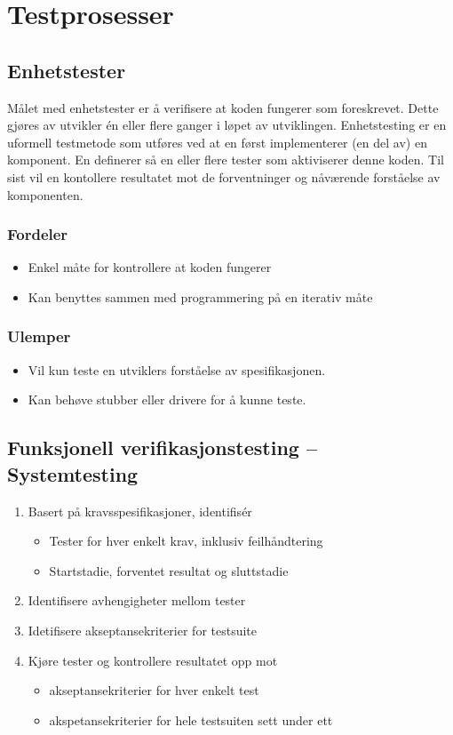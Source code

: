 \section{Testprosesser}

\subsection{Enhetstester}

Målet med enhetstester er å verifisere at koden fungerer som
foreskrevet. Dette gjøres av utvikler én eller flere ganger i løpet av
utviklingen. Enhetstesting er en uformell testmetode som utføres ved at
en først implementerer (en del av) en komponent. En definerer så en
eller flere tester som aktiviserer denne koden. Til sist vil en
kontollere resultatet mot de forventninger og nåværende forståelse av
komponenten.

\subsubsection{Fordeler}

\begin{itemize}
\item
  Enkel måte for kontrollere at koden fungerer
\item
  Kan benyttes sammen med programmering på en iterativ måte
\end{itemize}
\subsubsection{Ulemper}

\begin{itemize}
\item
  Vil kun teste en utviklers forståelse av spesifikasjonen.
\item
  Kan behøve stubber eller drivere for å kunne teste.
\end{itemize}
\subsection{Funksjonell verifikasjonstesting -- Systemtesting}

\begin{enumerate}[1.]
\item
  Basert på kravsspesifikasjoner, identifisér
  \begin{itemize}
  \item
    Tester for hver enkelt krav, inklusiv feilhåndtering
  \item
    Startstadie, forventet resultat og sluttstadie
  \end{itemize}
\item
  Identifisere avhengigheter mellom tester
\item
  Idetifisere akseptansekriterier for testsuite
\item
  Kjøre tester og kontrollere resultatet opp mot
  \begin{itemize}
  \item
    akseptansekriterier for hver enkelt test
  \item
    akspetansekriterier for hele testsuiten sett under ett
  \end{itemize}
\end{enumerate}
